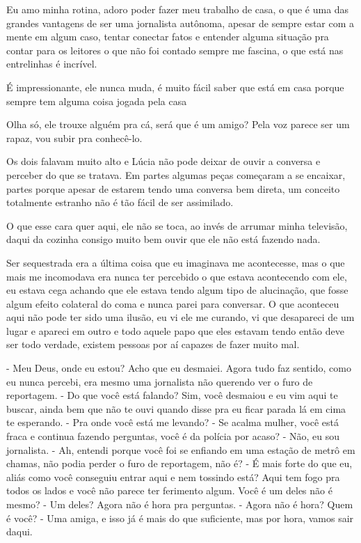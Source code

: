 
Eu amo minha rotina, adoro poder fazer meu trabalho de casa, o que é uma das grandes vantagens de ser uma jornalista autônoma, apesar de sempre estar com a mente em algum caso, tentar conectar fatos e entender alguma situação pra contar para os leitores o que não foi contado sempre me fascina, o que está nas entrelinhas é incrível.


É impressionante, ele nunca muda, é muito fácil saber que está em casa porque sempre tem alguma coisa jogada pela casa

Olha só, ele trouxe alguém pra cá, será que é um amigo? Pela voz parece ser um rapaz, vou subir pra conhecê-lo.

Os dois falavam muito alto e Lúcia não pode deixar de ouvir a conversa e perceber do que se tratava. Em partes algumas peças começaram a se encaixar, partes porque apesar de estarem tendo uma conversa bem direta, um conceito totalmente estranho não é tão fácil de ser assimilado.


O que esse cara quer aqui, ele não se toca, ao invés de arrumar minha televisão, daqui da cozinha consigo muito bem ouvir que ele não está fazendo nada.


Ser sequestrada era a última coisa que eu imaginava me acontecesse, mas o que mais me incomodava era nunca ter percebido o que estava acontecendo com ele, eu estava cega achando que ele estava tendo algum tipo de alucinação, que fosse algum efeito colateral do coma e nunca parei para conversar. O que aconteceu aqui não pode ter sido uma ilusão, eu vi ele me curando, vi que desapareci de um lugar e apareci em outro e todo aquele papo que eles estavam tendo então deve ser todo verdade, existem pessoas por aí capazes de fazer muito mal.


- Meu Deus, onde eu estou? Acho que eu desmaiei. Agora tudo faz sentido, como eu nunca percebi, era mesmo uma jornalista não querendo ver o furo de reportagem.
- Do que você está falando? Sim, você desmaiou e eu vim aqui te buscar, ainda bem que não te ouvi quando disse pra eu ficar parada lá em cima te esperando.
- Pra onde você está me levando?
- Se acalma mulher, você está fraca e continua fazendo perguntas, você é da polícia por acaso?
- Não, eu sou jornalista.
- Ah, entendi porque você foi se enfiando em uma estação de metrô em chamas, não podia perder o furo de reportagem, não é?
- É mais forte do que eu, aliás como você conseguiu entrar aqui e nem tossindo está? Aqui tem fogo pra todos os lados e você não parece ter ferimento algum. Você é um deles não é mesmo?
- Um deles? Agora não é hora pra perguntas.
- Agora não é hora? Quem é você?
- Uma amiga, e isso já é mais do que suficiente, mas por hora, vamos sair daqui.